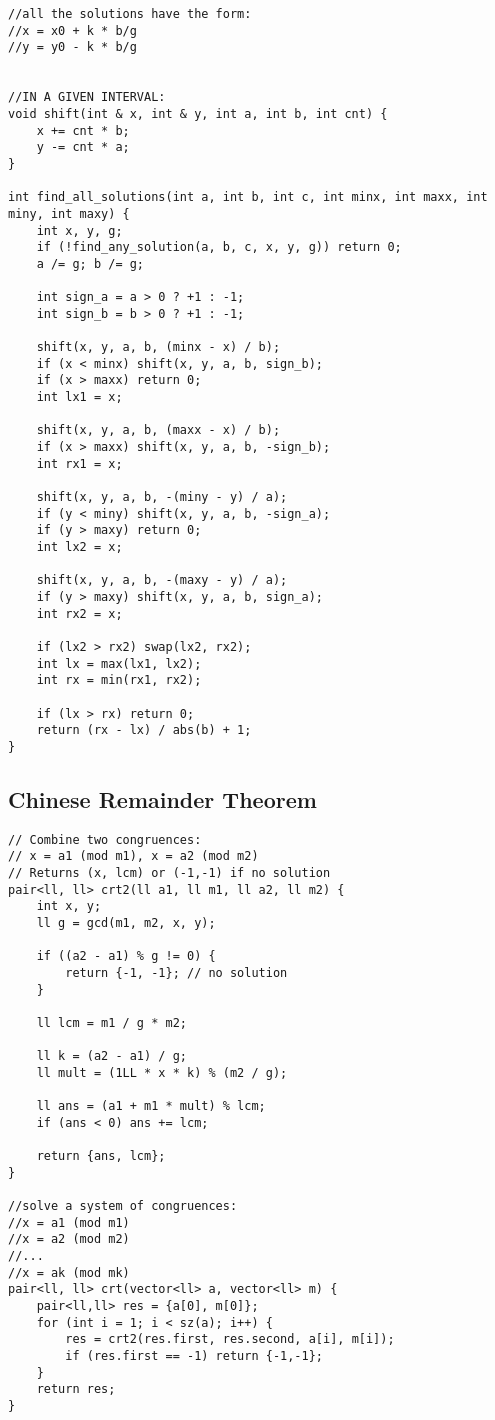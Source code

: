 \documentclass[11pt,a4paper]{article}
\begin{document}
\begin{multicols*}{2}
\begin{lstlisting}
//all the solutions have the form:
//x = x0 + k * b/g
//y = y0 - k * b/g


//IN A GIVEN INTERVAL:
void shift(int & x, int & y, int a, int b, int cnt) {
    x += cnt * b;
    y -= cnt * a;
}

int find_all_solutions(int a, int b, int c, int minx, int maxx, int miny, int maxy) {
    int x, y, g;
    if (!find_any_solution(a, b, c, x, y, g)) return 0;
    a /= g; b /= g;

    int sign_a = a > 0 ? +1 : -1;
    int sign_b = b > 0 ? +1 : -1;

    shift(x, y, a, b, (minx - x) / b);
    if (x < minx) shift(x, y, a, b, sign_b);
    if (x > maxx) return 0;
    int lx1 = x;

    shift(x, y, a, b, (maxx - x) / b);
    if (x > maxx) shift(x, y, a, b, -sign_b);
    int rx1 = x;

    shift(x, y, a, b, -(miny - y) / a);
    if (y < miny) shift(x, y, a, b, -sign_a);
    if (y > maxy) return 0;
    int lx2 = x;

    shift(x, y, a, b, -(maxy - y) / a);
    if (y > maxy) shift(x, y, a, b, sign_a);
    int rx2 = x;

    if (lx2 > rx2) swap(lx2, rx2);
    int lx = max(lx1, lx2);
    int rx = min(rx1, rx2);

    if (lx > rx) return 0;
    return (rx - lx) / abs(b) + 1;
}
\end{lstlisting}

\subsection{Chinese Remainder Theorem}
\begin{lstlisting}
// Combine two congruences: 
// x = a1 (mod m1), x = a2 (mod m2)
// Returns (x, lcm) or (-1,-1) if no solution
pair<ll, ll> crt2(ll a1, ll m1, ll a2, ll m2) {
    int x, y;
    ll g = gcd(m1, m2, x, y);

    if ((a2 - a1) % g != 0) {
        return {-1, -1}; // no solution
    }

    ll lcm = m1 / g * m2;

    ll k = (a2 - a1) / g;
    ll mult = (1LL * x * k) % (m2 / g);

    ll ans = (a1 + m1 * mult) % lcm;
    if (ans < 0) ans += lcm;

    return {ans, lcm};
}

//solve a system of congruences:
//x = a1 (mod m1)
//x = a2 (mod m2)
//...
//x = ak (mod mk)
pair<ll, ll> crt(vector<ll> a, vector<ll> m) {
    pair<ll,ll> res = {a[0], m[0]};
    for (int i = 1; i < sz(a); i++) {
        res = crt2(res.first, res.second, a[i], m[i]);
        if (res.first == -1) return {-1,-1};
    }
    return res;
}


\end{lstlisting}
\end{multicols*}
\end{document}
